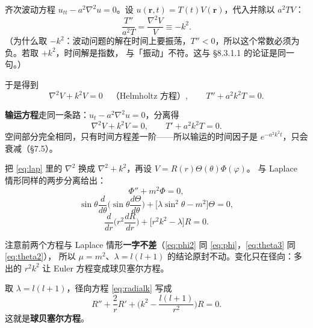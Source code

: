 \label{sec:s7}


齐次波动方程 $u_{tt}-a^2\nabla^2u=0$。设 $u(\mathbf r,t)=T(t)V(\mathbf r)$，代入并除以 $a^2TV$：
\[
\frac{T''}{a^2T}=\frac{\nabla^2V}{V}\equiv-k^2 .
\]
（为什么取 $-k^2$：波动问题的解在时间上要振荡，$T''<0$，所以这个常数必须为负。若取 $+k^2$，时间解是指数，
与「振动」不符。这与 §8.3.1.1 的论证是同一句。）

于是得到
\begin{equation}
\nabla^2V+k^2V=0\quad\text{（Helmholtz 方程）},\qquad
T''+a^2k^2T=0 .
\label{eq:helm}
\end{equation}

\textbf{输运方程}走同一条路：$u_t-a^2\nabla^2u=0$，分离得
\[
\nabla^2V+k^2V=0,\qquad T'+a^2k^2T=0 .
\]
空间部分完全相同，只有时间方程差一阶——所以输运的时间因子是 $e^{-a^2k^2t}$，只会衰减（\S7.5）。


把 \eqref{eq:lap} 里的 $\nabla^2$ 换成 $\nabla^2+k^2$，再设 $V=R(r)\Theta(\theta)\Phi(\varphi)$。
与 Laplace 情形同样的两步分离给出：
\begin{equation}
\Phi''+m^2\Phi=0 ,
\label{eq:phi2}
\end{equation}
\begin{equation}
\sin\theta\frac{d}{d\theta}\Big(\sin\theta\frac{d\Theta}{d\theta}\Big)+\big[\lambda\sin^2\theta-m^2\big]\Theta=0 ,
\label{eq:theta3}
\end{equation}
\begin{equation}
\frac{d}{dr}\Big(r^2\frac{dR}{dr}\Big)+\big[r^2k^2-\lambda\big]R=0 .
\label{eq:radialk}
\end{equation}

注意前两个方程与 Laplace 情形\textbf{一字不差}（\eqref{eq:phi2} 同 \eqref{eq:phi}，\eqref{eq:theta3} 同 \eqref{eq:theta2}），
所以 $\mu=m^2$、$\lambda=l(l+1)$ 的结论原封不动。变化只在径向：多出的 $r^2k^2$ 让 Euler 方程变成球贝塞尔方程。


取 $\lambda=l(l+1)$，径向方程 \eqref{eq:radialk} 写成
\begin{equation}
R''+\frac{2}{r}R'+\Big(k^2-\frac{l(l+1)}{r^2}\Big)R=0 .
\label{eq:sphbessel}
\end{equation}
这就是\textbf{球贝塞尔方程}。

